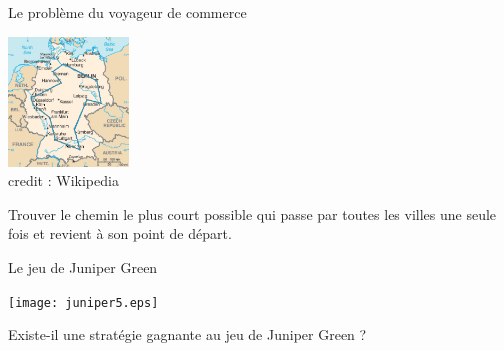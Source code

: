 \documentclass[10pt]{beamer}
\begin{document}
\begin{frame}[fragile]{\Ctitle}{\stitle}
	\begin{block}{Le problème du voyageur de commerce}
		\begin{center}
			\includegraphics[height=130px]{TSP_Deutschland.eps}\\
			{\footnotesize credit : Wikipedia}
		\end{center}
		Trouver le chemin le plus court possible qui passe par toutes les villes une seule fois et revient à son point de départ.
	\end{block}
\end{frame}


\begin{frame}[fragile]{\Ctitle}{\stitle}
	\begin{block}{Le jeu de Juniper Green}
		\begin{center}
			\texttt{[image: juniper5.eps]}\\
		\end{center}
		Existe-il une stratégie gagnante au jeu de Juniper Green ?
	\end{block}
\end{frame}
\end{document}
